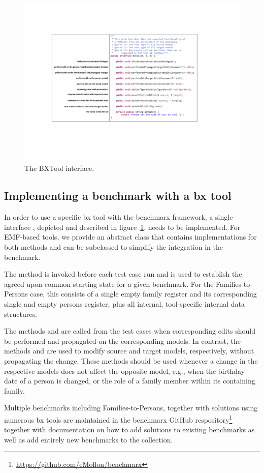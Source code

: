 \begin{figure}[tb!]
	\centering
	\includegraphics[width=\columnwidth]{diagrams/benchmarx/BXTool}
	\caption{The BXTool interface.}
	\label{fig:refImplementation}
\end{figure}

\subsection{Implementing a benchmark with a bx tool}

In order to use a specific bx tool with the benchmarx framework, a single interface , depicted and described in figure~\ref{fig:refImplementation}, needs to be implemented.
For EMF-based tools, we provide an abstract class  that contains implementations for both  methods and can be subclassed to simplify the integration in the benchmark.

The method  is invoked before each test case run and is used to establish the agreed upon common starting state for a given benchmark.
For the Families-to-Persons case, this consists of a single empty family register and its corresponding single and empty persons register, plus all internal, tool-specific internal data structures. 

The methods  and  are called from the test cases when corresponding edits should be performed and propagated on the corresponding models. 
In contrast, the methods  and  are used to modify source and target models, respectively, without propagating the change.
These methods should be used whenever a change in the respective models does not affect the opposite model, e.g., when the birthday date of a person is changed, or the role of a family member within its containing family.

Multiple benchmarks including Families-to-Persons, together with solutions using numerous bx tools are maintained in the benchmarx GitHub respository\footnote{\url{https://github.com/eMoflon/benchmarx}} together with documentation on how to add solutions to existing benchmarks as well as add entirely new benchmarks to the collection.